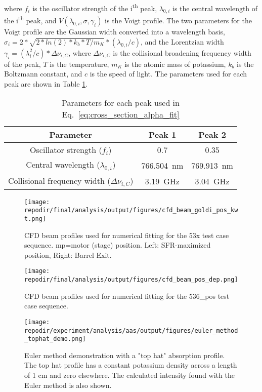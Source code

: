 where $f_i$ is the oscillator strength of the i\textsuperscript{th} peak, $\lambda_{0,i}$ is the central wavelength of the i\textsuperscript{th} peak, and $V(\lambda_{0,i},\sigma,\gamma_i)$ is the Voigt profile. The two parameters for the Voigt profile are the Gaussian width converted into a wavelength basis, $\sigma_i = 2*\sqrt{2*ln(2)*k_b*T/m_K}*(\lambda_{0,i}/c)$, and the Lorentzian width $\gamma_i = (\lambda_i^2/c)*\Delta \nu_{i,C}$, where $\Delta \nu_{i,C}$ is the collisional broadening frequency width of the peak, $T$ is the temperature, $m_K$ is the atomic mass of potassium, $k_b$ is the Boltzmann constant, and $c$ is the speed of light. The parameters used for each peak are shown in Table \ref{table:peak_parameters}. 

\begin{table}[H]
\centering
\caption{Parameters for each peak used in Eq.\ \ref{eq:cross_section_alpha_fit}}
\begin{tabular}{|c|c|c|}
\hline
Parameter & Peak 1 & Peak 2 \\
\hline
Oscillator strength ($f_i$) & 0.7 & 0.35 \\
Central wavelength ($\lambda_{0,i}$) & \SI{766.504} {\nano\meter} & \SI{769.913} {\nano\meter} \\
Collisional frequency width ($\Delta \nu_{i,C}$) & \SI{3.19} {\giga\hertz} & \SI{3.04} {\giga\hertz} \\
\hline
\end{tabular}
\label{table:peak_parameters}
\end{table}


\begin{figure}[]
    \centering
    \texttt{[image: \\repodir/final/analysis/output/figures/cfd\_beam\_goldi\_pos\_kwt.png]}
    \caption{CFD beam profiles used for numerical fitting for the 53x test case sequence. mp=motor (stage) position. Left: SFR-maximized position, Right: Barrel Exit.}
    \label{fig:SI_cfd_beam_goldi_pos_kwt}

    \texttt{[image: \\repodir/final/analysis/output/figures/cfd\_beam\_pos\_dep.png]}
    \caption{CFD beam profiles used for numerical fitting for the 536\_pos test case sequence.}
    \label{fig:SI_cfd_beam_pos_dep}
\end{figure}


\begin{figure}[]
    \centering
    \texttt{[image: \\repodir/experiment/analysis/aas/output/figures/euler\_method\_tophat\_demo.png]}
    \caption{Euler method demonstration with a "top hat" absorption profile. The top hat profile has a constant potassium density across a length of 1 cm and zero elsewhere. The calculated intensity found with the Euler method is also shown.}
    \label{fig:SI_euler_method_tophat_demo}
\end{figure}


